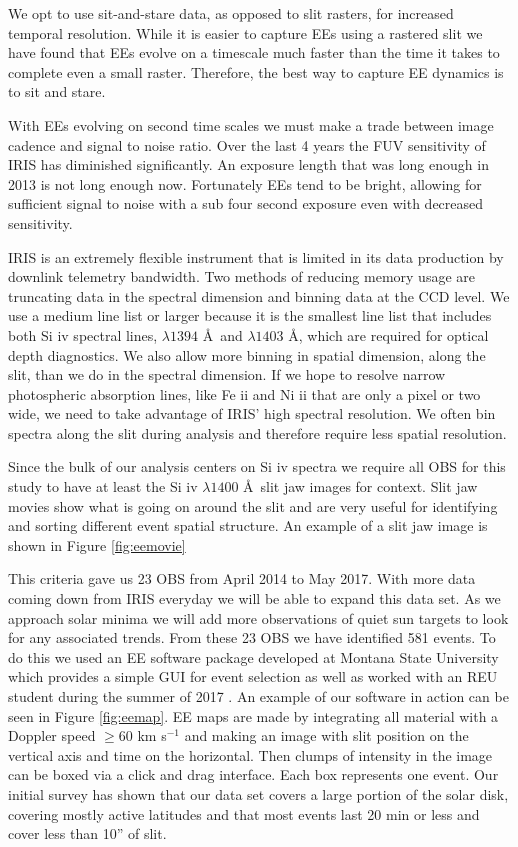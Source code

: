 \documentclass[]{aastex6}
\begin{document}
	We opt to use sit-and-stare data, as opposed to slit rasters, for increased temporal resolution.  While it is easier to capture EEs using a rastered slit we have found that EEs evolve on a timescale much faster than the time it takes to complete even a small raster.  Therefore, the best way to capture EE dynamics is to sit and stare.  
	
	With EEs evolving on second time scales we must make a trade between image cadence and signal to noise ratio.  Over the last 4 years the FUV sensitivity of IRIS has diminished significantly.  An exposure length that was long enough in 2013 is not long enough now.  Fortunately EEs tend to be bright, allowing for sufficient signal to noise with a sub four second exposure even with decreased sensitivity.  
	
	IRIS is an extremely flexible instrument that is limited in its data production by downlink telemetry bandwidth.  Two methods of reducing memory usage are truncating data in the spectral dimension and binning data at the CCD level.  We use a medium line list or larger because it is the smallest line list that includes both Si {\sc iv}  spectral lines, $\lambda 1394$ \AA\  and $\lambda 1403$ \AA, which are required for optical depth diagnostics.  We also allow more binning in spatial dimension, along the slit, than we do in the spectral dimension. If we hope to resolve narrow photospheric absorption lines, like Fe {\sc ii} and Ni {\sc ii} that are only a pixel or two wide, we need to take advantage of IRIS' high spectral resolution.  We often bin spectra along the slit during analysis and therefore require less spatial resolution.
	
	Since the bulk of our analysis centers on Si {\sc iv} spectra we require all OBS for this study to have at least the Si {\sc iv} $\lambda1400$ \AA \ slit jaw images for context.  Slit jaw movies show what is going on around the slit and are very useful for identifying and sorting different event spatial structure. An example of a slit jaw image is shown in Figure \ref{fig:eemovie}
	
	This criteria gave us 23 OBS from April 2014 to May 2017.  With more data coming down from IRIS everyday we will be able to expand this data set.  As we approach solar minima we will add more observations of quiet sun targets to look for any associated trends.  From these 23 OBS we have identified 581 events.  To do this we used an EE software package developed at Montana State University which provides a simple GUI for event selection as well as worked with an REU student during the summer of 2017 \citep{Bartz2018}.  An example of our software in action can be seen in Figure \ref{fig:eemap}.  EE maps are made by integrating all material with a Doppler speed $\geq60$ km s$^{-1}$ and making an image with slit position on the vertical axis and time on the horizontal.  Then clumps of intensity in the image can be boxed via a click and drag interface.  Each box represents one event. Our initial survey has shown that our data set covers a large portion of the solar disk, covering mostly active latitudes and that most events last 20 min or less and cover less than 10'' of slit.
	
\end{document}
